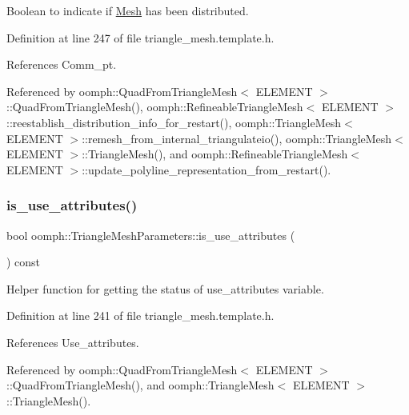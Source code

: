 Boolean to indicate if \hyperlink{classoomph_1_1Mesh}{Mesh} has been distributed. 



Definition at line 247 of file triangle\+\_\+mesh.\+template.\+h.



References Comm\+\_\+pt.



Referenced by oomph\+::\+Quad\+From\+Triangle\+Mesh$<$ E\+L\+E\+M\+E\+N\+T $>$\+::\+Quad\+From\+Triangle\+Mesh(), oomph\+::\+Refineable\+Triangle\+Mesh$<$ E\+L\+E\+M\+E\+N\+T $>$\+::reestablish\+\_\+distribution\+\_\+info\+\_\+for\+\_\+restart(), oomph\+::\+Triangle\+Mesh$<$ E\+L\+E\+M\+E\+N\+T $>$\+::remesh\+\_\+from\+\_\+internal\+\_\+triangulateio(), oomph\+::\+Triangle\+Mesh$<$ E\+L\+E\+M\+E\+N\+T $>$\+::\+Triangle\+Mesh(), and oomph\+::\+Refineable\+Triangle\+Mesh$<$ E\+L\+E\+M\+E\+N\+T $>$\+::update\+\_\+polyline\+\_\+representation\+\_\+from\+\_\+restart().

\mbox{\label{classoomph_1_1TriangleMeshParameters_a47e45fd5669ff6260dd3198f6b3fa75c}} 
\subsubsection{\texorpdfstring{is\+\_\+use\+\_\+attributes()}{is\_use\_attributes()}}
{\footnotesize\ttfamily bool oomph\+::\+Triangle\+Mesh\+Parameters\+::is\+\_\+use\+\_\+attributes (\begin{DoxyParamCaption}{ }\end{DoxyParamCaption}) const\hspace{0.3cm}{\ttfamily [inline]}}



Helper function for getting the status of use\+\_\+attributes variable. 



Definition at line 241 of file triangle\+\_\+mesh.\+template.\+h.



References Use\+\_\+attributes.



Referenced by oomph\+::\+Quad\+From\+Triangle\+Mesh$<$ E\+L\+E\+M\+E\+N\+T $>$\+::\+Quad\+From\+Triangle\+Mesh(), and oomph\+::\+Triangle\+Mesh$<$ E\+L\+E\+M\+E\+N\+T $>$\+::\+Triangle\+Mesh().

